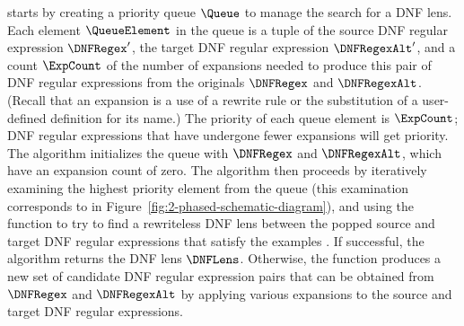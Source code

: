 \documentclass[sigplan,acmsmall]{acmart}
\begin{document}
\SynthDNFLens{} starts by creating a priority queue $\Queue$ to manage
the search for a DNF lens.  Each element $\QueueElement$  in the queue
is a tuple of 
the source DNF regular expression $\DNFRegex'$, 
the target DNF regular expression $\DNFRegexAlt'$, 
and a count $\ExpCount$ of the number
of expansions needed to produce this pair of DNF
regular expressions from the originals $\DNFRegex$ and
$\DNFRegexAlt$.  (Recall that an expansion is a 
use of a rewrite rule or the substitution of a user-defined
definition for its name.) The priority of each queue element is $\ExpCount$; DNF regular
expressions that have undergone fewer expansions will get priority.
The algorithm initializes the queue with
$\DNFRegex$ and $\DNFRegexAlt$, which have an expansion count of
zero.  The algorithm then proceeds by iteratively examining the
highest priority element from the queue (this examination corresponds to
\TypeProp{} in Figure~\ref{fig:2-phased-schematic-diagram}), and using the 
function \RigidSynth{} to try to find a rewriteless DNF lens
between the popped source and target DNF regular expressions that satisfy
the examples \Examples{}.  If successful, the algorithm returns the
DNF lens $\DNFLens$.  Otherwise, the function \Expand{} produces
a new set of candidate DNF regular expression pairs that can
be obtained from $\DNFRegex$ and $\DNFRegexAlt$ by
applying various expansions to the source and target DNF regular
expressions.
\end{document}
